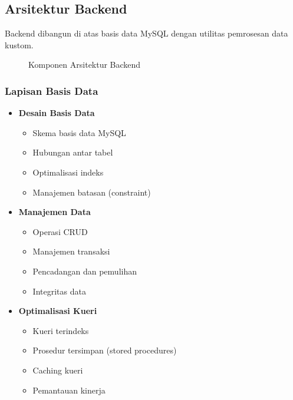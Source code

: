 \documentclass[12pt,a4paper]{article}
\begin{document}
\subsection{Arsitektur Backend}
Backend dibangun di atas basis data MySQL dengan utilitas pemrosesan data kustom.

\begin{figure}[h]
\centering
{}
\caption{Komponen Arsitektur Backend}
\end{figure}

\subsubsection{Lapisan Basis Data}
\begin{itemize}
    \item \textbf{Desain Basis Data}
    \begin{itemize}
        \item Skema basis data MySQL
        \item Hubungan antar tabel
        \item Optimalisasi indeks
        \item Manajemen batasan (constraint)
    \end{itemize}
    
    \item \textbf{Manajemen Data}
    \begin{itemize}
        \item Operasi CRUD
        \item Manajemen transaksi
        \item Pencadangan dan pemulihan
        \item Integritas data
    \end{itemize}
    
    \item \textbf{Optimalisasi Kueri}
    \begin{itemize}
        \item Kueri terindeks
        \item Prosedur tersimpan (stored procedures)
        \item Caching kueri
        \item Pemantauan kinerja
    \end{itemize}
\end{itemize}
\end{document}
